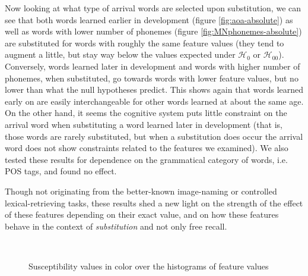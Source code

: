 Now looking at what type of arrival words are selected upon substitution, we can see that both words learned earlier in development (figure \ref{fig:aoa-absolute}) as well as words with lower number of phonemes (figure \ref{fig:MNphonemes-absolute}) are substituted for words with roughly the same feature values (they tend to augment a little, but stay way below the values expected under $\mathcal{H}_0$ or $\mathcal{H}_{00}$). Conversely, words learned later in development and words with higher number of phonemes, when substituted, go towards words with lower feature values, but no lower than what the null hypotheses predict. This shows again that words learned early on are easily interchangeable for other words learned at about the same age. On the other hand, it seems the cognitive system puts little constraint on the arrival word when substituting a word learned later in development (that is, those words are rarely substituted, but when a substitution does occur the arrival word does not show constraints related to the features we examined). We also tested these results for dependence on the grammatical category of words, i.e. POS tags, and found no effect.

Though not originating from the better-known image-naming or controlled lexical-retrieving tasks, these results shed a new light on the strength of the effect of these features depending on their exact value, and on how these features behave in the context of \emph{substitution} and not only free recall.


\begin{figure}[!th]
	\centering
	~
	\caption{Susceptibility values in color over the histograms of feature values}
\end{figure}


